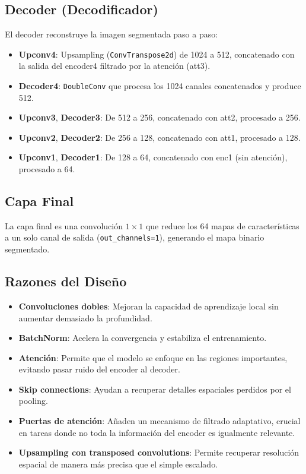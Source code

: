 \subsection*{Decoder (Decodificador)}
El decoder reconstruye la imagen segmentada paso a paso:
\begin{itemize}
    \item \textbf{Upconv4}: Upsampling (\texttt{ConvTranspose2d}) de 1024 a 512, concatenado con la salida del encoder4 filtrado por la atención (att3).
    \item \textbf{Decoder4}: \texttt{DoubleConv} que procesa los 1024 canales concatenados y produce 512.
    \item \textbf{Upconv3}, \textbf{Decoder3}: De 512 a 256, concatenado con att2, procesado a 256.
    \item \textbf{Upconv2}, \textbf{Decoder2}: De 256 a 128, concatenado con att1, procesado a 128.
    \item \textbf{Upconv1}, \textbf{Decoder1}: De 128 a 64, concatenado con enc1 (sin atención), procesado a 64.
\end{itemize}

\subsection*{Capa Final}
La capa final es una convolución $1\times1$ que reduce los 64 mapas de características a un solo canal de salida (\texttt{out\_channels=1}), generando el mapa binario segmentado.

\subsection*{Razones del Diseño}
\begin{itemize}
    \item \textbf{Convoluciones dobles}: Mejoran la capacidad de aprendizaje local sin aumentar demasiado la profundidad.
    \item \textbf{BatchNorm}: Acelera la convergencia y estabiliza el entrenamiento.
    \item \textbf{Atención}: Permite que el modelo se enfoque en las regiones importantes, evitando pasar ruido del encoder al decoder.
    \item \textbf{Skip connections}: Ayudan a recuperar detalles espaciales perdidos por el pooling.
    \item \textbf{Puertas de atención}: Añaden un mecanismo de filtrado adaptativo, crucial en tareas donde no toda la información del encoder es igualmente relevante.
    \item \textbf{Upsampling con transposed convolutions}: Permite recuperar resolución espacial de manera más precisa que el simple escalado.
\end{itemize}

